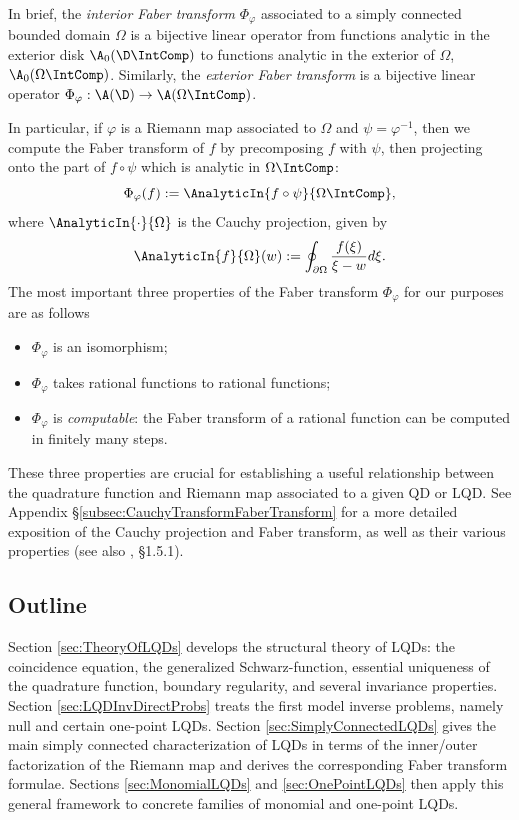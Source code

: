 \documentclass{article}
\numberwithin{equation}{section}
\begin{document}
In brief, the \emph{interior Faber transform} $\Phi_\varphi$ associated to a simply connected bounded domain $\Omega$ is a bijective linear operator from functions analytic in the exterior disk $\A_0(\D\IntComp)$ to functions analytic in the exterior of $\Omega$, $\A_0(\Omega\IntComp)$. Similarly, the \emph{exterior Faber transform} is a bijective linear operator $\Phi_{\varphi}:\A(\D)\rightarrow\A(\Omega\IntComp)$.

In particular, if $\varphi$ is a Riemann map associated to $\Omega$ and $\psi=\varphi^{-1}$, then we compute the Faber transform of $f$ by precomposing $f$ with $\psi$, then projecting onto the part of $f\circ\psi$ which is analytic in $\Omega\IntComp$: 
$$\Phi_{\varphi}(f):=\AnalyticIn{f\circ\psi}{\Omega\IntComp},$$
where $\AnalyticIn{\cdot}{\Omega}$ is the Cauchy projection, given by
$$\AnalyticIn{f}{\Omega}(w):=\oint_{\partial\Omega}\dfrac{f(\xi)}{\xi-w}d\xi.$$
The most important three properties of the Faber transform $\Phi_{\varphi}$ for our purposes are as follows
\begin{itemize}
    \item $\Phi_{\varphi}$ is an isomorphism;
    \item $\Phi_{\varphi}$ takes rational functions to rational functions;
    \item $\Phi_{\varphi}$ is \emph{computable}: the Faber transform of a rational function can be computed in finitely many steps.
\end{itemize}
These three properties are crucial for establishing a useful relationship between the quadrature function and Riemann map associated to a given QD or LQD. See Appendix \S\ref{subsec:CauchyTransformFaberTransform} for a more detailed exposition of the Cauchy projection and Faber transform, as well as their various properties (see also \cite{GravenMakarov2025}, \S1.5.1).



\subsection{Outline}

Section \ref{sec:TheoryOfLQDs} develops the structural theory of LQDs: the coincidence equation, the generalized Schwarz-function, essential uniqueness of the quadrature function, boundary regularity, and several invariance properties. Section \ref{sec:LQDInvDirectProbs} treats the first model inverse problems, namely null and certain one-point LQDs. Section \ref{sec:SimplyConnectedLQDs} gives the main simply connected characterization of LQDs in terms of the inner/outer factorization of the Riemann map and derives the corresponding Faber transform formulae. Sections \ref{sec:MonomialLQDs} and \ref{sec:OnePointLQDs} then apply this general framework to concrete families of monomial and one-point LQDs.
\end{document}
